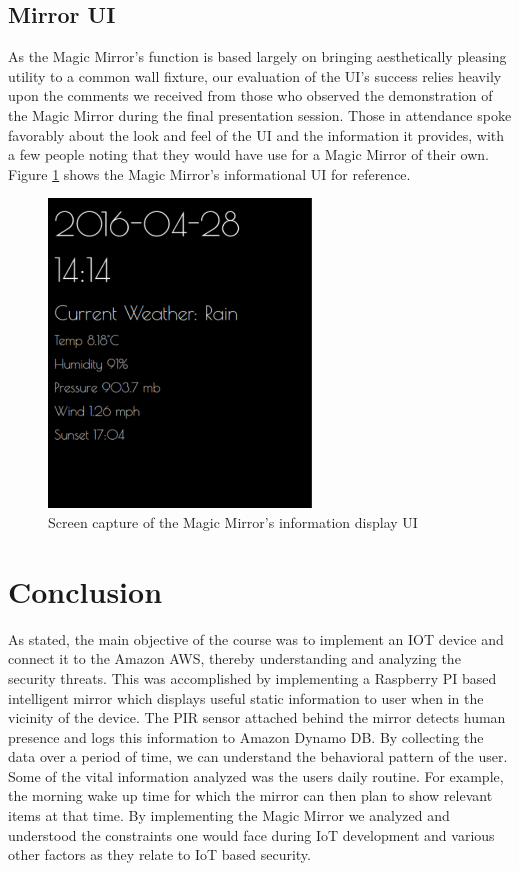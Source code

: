 \documentclass[conference]{IEEEtran}
\begin{document}
\subsection{Mirror UI}
As the Magic Mirror's function is based largely on bringing aesthetically pleasing utility to a common wall fixture, our evaluation of the UI's success relies heavily upon the comments we received from those who observed the demonstration of the Magic Mirror during the final presentation session.
Those in attendance spoke favorably about the look and feel of the UI and the information it provides, with a few people noting that they would have use for a Magic Mirror of their own.
Figure \ref{fig:mirrorui} shows the Magic Mirror's informational UI for reference.
\begin{figure}[!ht]
\centering
\includegraphics[width=2.75in]{images/mirror-ss.png}
\caption{Screen capture of the Magic Mirror's information display UI}
\label{fig:mirrorui}
\end{figure}


\section{Conclusion}

As stated, the main objective of the course was to implement an IOT device and connect it to the Amazon AWS, thereby understanding and analyzing the security threats. This was accomplished by implementing a Raspberry PI based intelligent mirror which displays useful static information to user when in the vicinity of the device. The PIR sensor attached behind the mirror detects human presence and logs this information to Amazon Dynamo DB. By collecting the data over a period of time, we can understand the behavioral pattern of the user. Some of the vital information analyzed was the users daily routine. For example, the morning wake up time for which the mirror can then plan to show relevant items at that time. By implementing the Magic Mirror we analyzed and understood the constraints one would face during IoT development and various other factors as they relate to IoT based security.
\end{document}
